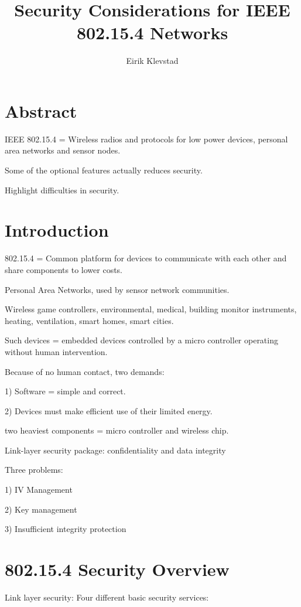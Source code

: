 \documentclass[10pt]{article}
\begin{document}
\author{Eirik Klevstad}
\title{Security Considerations for IEEE 802.15.4 Networks}
\maketitle


\section{Abstract}


IEEE 802.15.4 = Wireless radios and protocols for low power devices, personal area networks and sensor nodes.

Some of the optional features actually reduces security.

Highlight difficulties in security.

\section{Introduction}


802.15.4 = Common platform for devices to communicate with each other and share components to lower costs.

Personal Area Networks, used by sensor network communities.

Wireless game controllers, environmental, medical, building monitor instruments, heating, ventilation, smart homes, smart cities.

Such devices = embedded devices controlled by a micro controller operating without human intervention.

Because of no human contact, two demands:

1) Software = simple and correct.

2) Devices must make efficient use of their limited energy.

two heaviest components = micro controller and wireless chip.

Link-layer security package: confidentiality and data integrity

Three problems:

1) IV Management

2) Key management

3) Insufficient integrity protection

\section{802.15.4 Security Overview}

Link layer security: Four different basic security services:
\end{document}
